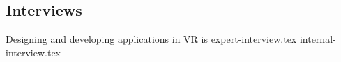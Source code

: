 \subsection{Interviews}
Designing and developing applications in VR is
{expert-interview.tex} 
{internal-interview.tex}
